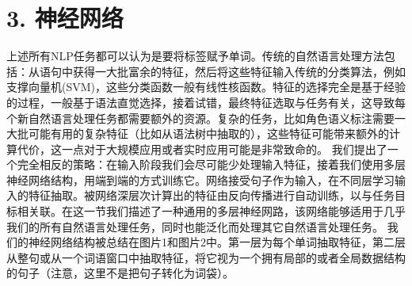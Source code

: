 \section*{3. 神经网络}
上述所有NLP任务都可以认为是要将标签赋予单词。传统的自然语言处理方法包括：从语句中获得一大批富余的特征，然后将这些特征输入传统的分类算法，例如支撑向量机(SVM)，这些分类函数一般有线性核函数。特征的选择完全是基于经验的过程，一般基于语法直觉选择，接着试错，最终特征选取与任务有关，这导致每个新自然语言处理任务都需要额外的资源。复杂的任务，比如角色语义标注需要一大批可能有用的复杂特征（比如从语法树中抽取的），这些特征可能带来额外的计算代价，这一点对于大规模应用或者实时应用可能是非常致命的。
我们提出了一个完全相反的策略：在输入阶段我们会尽可能少处理输入特征，接着我们使用多层神经网络结构，用端到端的方式训练它。网络接受句子作为输入，在不同层学习输入的特征抽取。被网络深层次计算出的特征由反向传播进行自动训练，以与任务目标相关联。在这一节我们描述了一种通用的多层神经网路，该网络能够适用于几乎我们的所有自然语言处理任务，同时也能泛化而处理其它自然语言处理任务。
我们的神经网络结构被总结在图片1和图片2中。第一层为每个单词抽取特征，第二层从整句或从一个词语窗口中抽取特征，将它视为一个拥有局部的或者全局数据结构的句子（注意，这里不是把句子转化为词袋）。
